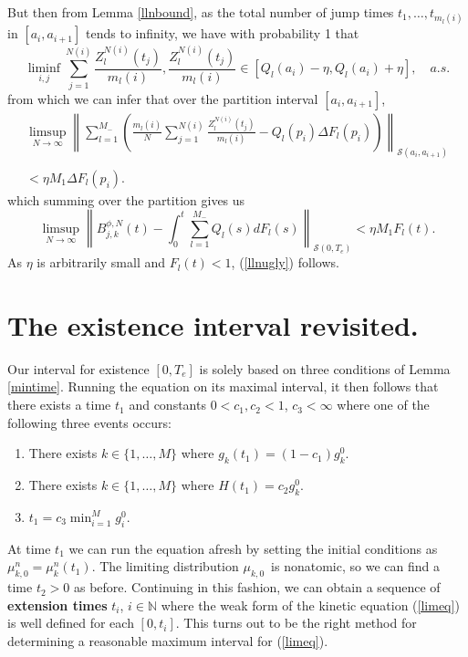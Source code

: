 But then from Lemma \ref{llnbound}, as the total number of jump times $t_1, \dots, t_{m_l(i)}$ in $[a_i, a_{i+1}]$ tends to infinity, we have with probability 1 that  
\begin{equation}
\liminf_{i,j} \sum_{j = 1}^{N(i)} \frac{Z^{N(i)}_l(t_j)}{m_l(i)},\frac{Z^{N(i)}_l(t_j)}{m_l(i)} \in \left[Q_{l}(a_i) - \eta, Q_{l}(a_i) + \eta\right], \quad a.s.
\end{equation}
from which we can infer that over the partition interval $ [a_i, a_{i+1}]$,
\begin{eqnarray}
\limsup_{N \rightarrow \infty}\left \|\sum_{l = 1}^{M_-}\left(\frac{m_l(i)}{N}\sum_{j = 1}^{N(i)} \frac{Z^{N(i)}_l(t_j)}{m_l(i)}-Q_{l}(p_i) \Delta F_{l}(p_i)\right)\right\|_{\mathcal S(a_{i},a_{i+1})} \\
\nonumber\\
<\eta M_{1}\Delta F_{l}(p_i). \nonumber
\end{eqnarray}
which summing over the partition gives us
\begin{equation}
\limsup_{N\rightarrow \infty}\left\| B_{j,k}^{\phi,N}(t)-\int_0^t \sum_{l = 1}^{M_-}Q_{l}(s) dF_l(s)\right\|_{\mathcal S(0,T_e)} <\eta M_{1} F_{l}(t).
\end{equation}
As $\eta$ is arbitrarily small and $F_l(t)<1$,  (\ref{llnugly}) follows.
\section{The existence interval revisited.}\label{cogitotime}

Our interval for existence $[0,T_e]$ is solely based on three conditions of Lemma \ref{mintime}.  Running the equation on its maximal interval, it then follows that there exists a time $t_1$ and constants $0<c_1,c_2<1$, $c_3 < \infty$ where one of the following three events occurs:\begin{enumerate}
\item 
There exists $k \in \{1, \dots, M\}$ where $g_k(t_1) = (1-c_1)g^0_k.$
\item There exists $k \in \{1, \dots, M\}$ where $H(t_1) = c_2g_{k}^0.$
\item $t_{1} = c_3\min_{i= 1}^M g_i^0$.
 \end{enumerate}
 At time $t_1$ we can run the equation afresh by setting the initial conditions as $\mu_{k,0}^{n} = \mu_k^n(t_1)$.  The limiting distribution $\mu_{k,0}$\ is nonatomic, so we can find a time $t_2>0$ as before. Continuing in this fashion, we can obtain a sequence of \textbf{extension times} $t_i$, $i \in \mathbb N$ where the weak form of the kinetic equation (\ref{limeq}) is well defined for each $[0,t_i]$. This turns out to be the right method for determining a reasonable maximum interval for (\ref{limeq}).

